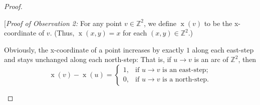 \begin{definition}
\begin{proof}
\begin{fineprint}
[\textit{Proof of Observation 2:} For any point $v\in\mathbb{Z}^{2}$, we
define $\operatorname*{x}\left(  v\right)  $ to be the x-coordinate of $v$.
(Thus, $\operatorname*{x}\left(  x,y\right)  =x$ for each $\left(  x,y\right)
\in\mathbb{Z}^{2}$.)

Obviously, the x-coordinate of a point increases by exactly $1$ along each
east-step and stays unchanged along each north-step: That is, if $u\rightarrow
v$ is an arc of $\mathbb{Z}^{2}$, then%
\begin{equation}
\operatorname*{x}\left(  v\right)  -\operatorname*{x}\left(  u\right)  =%
\begin{cases}
1, & \text{if }u\rightarrow v\text{ is an east-step;}\\
0, & \text{if }u\rightarrow v\text{ is a north-step.}%
\end{cases}
\label{pf.prop.lgv.1-paths.ct.o2.pf.1}%
\end{equation}

\end{fineprint}


\end{proof}
\end{definition}
